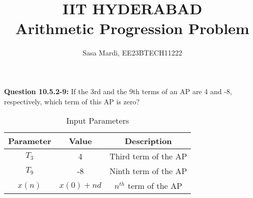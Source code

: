 \documentclass[journal,12pt,twocolumn]{IEEEtran}
\theoremstyle{remark}
\begin{document}
\title{IIT HYDERABAD \\Arithmetic Progression Problem}
\author{Sasa Mardi, EE23BTECH11222}
\date{}
\maketitle
\textbf{Question 10.5.2-9:}
If the 3rd and the 9th terms of an AP are 4 and -8, respectively, which term of this AP is zero? \\
\solution
\begin{table}[h!]
    \centering
    \caption{Input Parameters}
    \label{tab:1}
    \begin{tabular}{ | c | c | c | }
        \hline
        Parameter & Value & Description \\
        \hline
        $T_3$ & 4 & Third term of the AP \\
        \hline
        $T_9$ & -8 & Ninth term of the AP \\
        \hline
         $x(n)$ & $x(0) + nd$ & $n^{th}$ term of the AP \\
        \hline
    \end{tabular}
\end{table}
\end{document}
